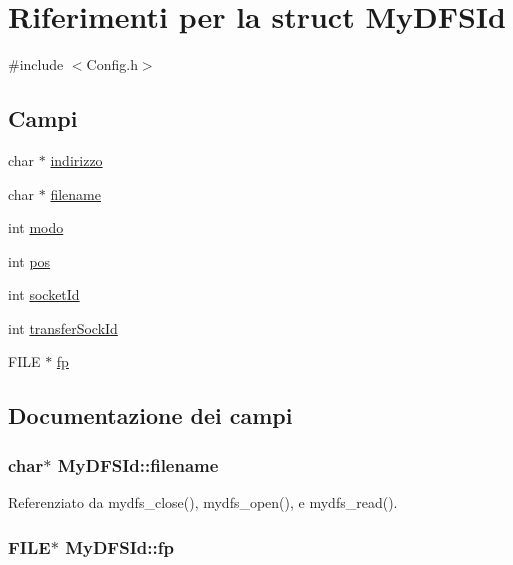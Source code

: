 \hypertarget{structMyDFSId}{\section{Riferimenti per la struct My\+D\+F\+S\+Id}
\label{structMyDFSId}
}


{\ttfamily \#include $<$Config.\+h$>$}

\subsection*{Campi}
\begin{DoxyCompactItemize}
\item 
char $\ast$ \hyperlink{structMyDFSId_ac8c10a1a5b18776bf5e5585ee9e26331}{indirizzo}
\item 
char $\ast$ \hyperlink{structMyDFSId_ac0e1b8c96d859982c1a7d49f9e929e48}{filename}
\item 
int \hyperlink{structMyDFSId_a98bc5ce1a7734459d8b81c997da4e9f0}{modo}
\item 
int \hyperlink{structMyDFSId_aaeac229fb85c313f91a76f00be916832}{pos}
\item 
int \hyperlink{structMyDFSId_a382a74f109962751085cea7aac2892cc}{socket\+Id}
\item 
int \hyperlink{structMyDFSId_a3b62a6d0f52a871bda4bf9cd56c57ff7}{transfer\+Sock\+Id}
\item 
F\+I\+L\+E $\ast$ \hyperlink{structMyDFSId_ae2badd91d3b506420a9e49554df8212d}{fp}
\end{DoxyCompactItemize}


\subsection{Documentazione dei campi}
\hypertarget{structMyDFSId_ac0e1b8c96d859982c1a7d49f9e929e48}{
\subsubsection[{filename}]{\setlength{\rightskip}{0pt plus 5cm}char$\ast$ My\+D\+F\+S\+Id\+::filename}}\label{structMyDFSId_ac0e1b8c96d859982c1a7d49f9e929e48}


Referenziato da mydfs\+\_\+close(), mydfs\+\_\+open(), e mydfs\+\_\+read().

\hypertarget{structMyDFSId_ae2badd91d3b506420a9e49554df8212d}{
\subsubsection[{fp}]{\setlength{\rightskip}{0pt plus 5cm}F\+I\+L\+E$\ast$ My\+D\+F\+S\+Id\+::fp}}\label{structMyDFSId_ae2badd91d3b506420a9e49554df8212d}


